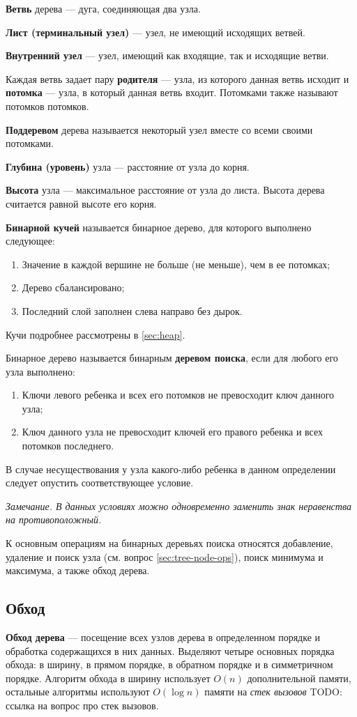 \textbf{Ветвь} дерева --- дуга, соединяющая два узла. 

\textbf{Лист (терминальный узел)} --- узел, не имеющий исходящих ветвей.

\textbf{Внутренний узел} --- узел, имеющий как входящие, так и исходящие ветви.

Каждая ветвь задает пару \textbf{родителя} --- узла, из которого данная ветвь исходит
и \textbf{потомка} --- узла, в который данная ветвь входит. Потомками также называют
потомков потомков.

\textbf{Поддеревом} дерева называется некоторый узел вместе со всеми своими потомками.

\textbf{Глубина (уровень)} узла --- расстояние от узла до корня.

\textbf{Высота} узла --- максимальное расстояние от узла до листа. Высота дерева считается
равной высоте его корня.

\textbf{Бинарной кучей} называется бинарное дерево, для которого выполнено следующее:
\begin{enumerate}
  \item Значение в каждой вершине не больше (не меньше), чем в ее потомках;
  \item Дерево сбалансировано;
  \item Последний слой заполнен слева направо без дырок.
\end{enumerate}
Кучи подробнее рассмотрены в \ref{sec:heap}.

\label{def:bst}
Бинарное дерево называется бинарным \textbf{деревом поиска}, если для любого его узла выполнено:
\begin{enumerate}
  \item Ключи левого ребенка и всех его потомков не превосходит ключ данного узла;
  \item Ключ данного узла не превосходит ключей его правого ребенка и всех потомков последнего.
\end{enumerate}
В случае несуществования у узла какого-либо ребенка в данном определении следует опустить соответствующее условие.

{\small\itshape Замечание. В данных условиях можно одновременно заменить знак неравенства на противоположный.}

К основным операциям на бинарных деревьях поиска относятся добавление, удаление и поиск узла (см. вопрос \ref{sec:tree-node-ops}),
поиск минимума и максимума, а также обход дерева.

\subsection{Обход}
\textbf{Обход дерева} --- посещение всех узлов дерева в определенном порядке и обработка содержащихся в них данных.
Выделяют четыре основных порядка обхода: в ширину, в прямом порядке, в обратном порядке и в симметричном порядке.
Алгоритм обхода в ширину использует $O(n)$ дополнительной памяти, остальные алгоритмы используют $O(\log n)$ памяти
на \textit{стек вызовов} {\color{red} TODO: ссылка на вопрос про стек вызовов}.

